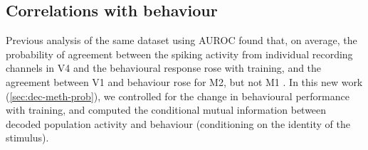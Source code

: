 \subsection{Correlations with behaviour}


Previous analysis of the same dataset using \ac{AUROC} found that, on average, the probability of agreement between the spiking activity from individual recording channels in \ac{V4} and the behavioural response rose with training, and the agreement between \ac{V1} and behaviour rose for \ac{M2}, but not \ac{M1} \citep{Chen2013thesis}.
In this new work (\autoref{sec:dec-meth-prob}), we controlled for the change in behavioural performance with training, and computed the conditional mutual information between decoded population activity and behaviour (conditioning on the identity of the stimulus).

